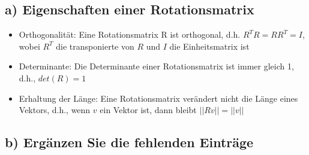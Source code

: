 \documentclass{article}
\begin{document}
\subsection{a) Eigenschaften einer Rotationsmatrix}

\begin{itemize}
    \item Orthogonalität: Eine Rotationsmatrix R ist orthogonal, d.h. $ R^T R = RR^T = I$, wobei $R^T$ die transponierte von $R$ und $I$ die Einheitsmatrix ist
    \item Determinante: Die Determinante einer Rotationsmatrix ist immer gleich 1, d.h., $det(R) = 1$
    \item Erhaltung der Länge: Eine Rotationsmatrix verändert nicht die Länge eines Vektors, d.h., wenn $v$ ein Vektor ist, dann bleibt $||Rv|| = ||v||$
\end{itemize}

\subsection{b) Ergänzen Sie die fehlenden Einträge}
\end{document}
